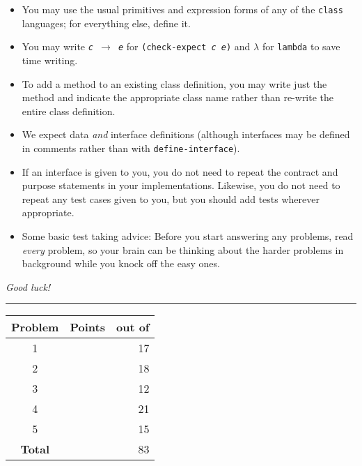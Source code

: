 \documentclass[12pt]{article}                   %
\newcommand\code[1]{\texttt{#1}}
\begin{document}
\noindent\begin{minipage}{8cm}\sloppy
\begin{itemize}
\item You may use the usual primitives and expression forms of any of
  the \code{class} languages; for everything else, define it.

\item You may write {\tt {\slshape c} $\rightarrow$ {\slshape e}} for
  {\tt (check-expect {\slshape c e})} and $\lambda$ for
  \code{lambda} to save time writing.

\item To add a method to an existing class definition, you
  may write just the method and indicate the appropriate class name
  rather than re-write the entire class definition.

\item We expect data \emph{and} interface definitions
  (although interfaces may be defined in comments rather than
  with \code{define-interface}).

\item If an interface is given to you, you do not need to repeat the
  contract and purpose statements in your implementations.  Likewise,
  you do not need to repeat any test cases given to you, but you
  should add tests wherever appropriate.


\item Some basic test taking advice: Before you start answering
any problems, read \emph{every} problem, so your brain can be thinking
about the harder problems in background while you knock off the easy ones.
\end{itemize}

\bigskip

\emph{Good luck!}
\end{minipage}\hfil\begin{minipage}[t]{6cm}
\rule{1cm}{0pt}\begin{tabular}{|c|l|@{/}r|}
\hline
{\bf Problem} & Points & out of \\ \hline
1 & & 17\\ \hline
2 & & 18\\ \hline
3 & & 12\\ \hline
4 & & 21\\ \hline
5 & & 15\\ \hline
{\bf Total} & & 83 \\ \hline
\end{tabular}
\end{minipage}
\end{document}
